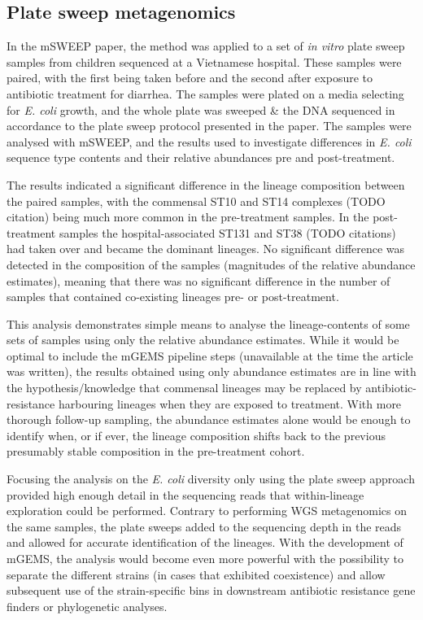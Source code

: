 \documentclass[officiallayout]{tktla}
\begin{document}
\subsection{Plate sweep metagenomics}

In the mSWEEP paper, the method was applied to a set of \textit{in
  vitro} plate sweep samples from children sequenced at a Vietnamese
hospital. These samples were paired, with the first being taken before
and the second after exposure to antibiotic treatment for
diarrhea. The samples were plated on a media selecting for
\textit{E. coli} growth, and the whole plate was sweeped \& the DNA
sequenced in accordance to the plate sweep protocol presented in the
paper. The samples were analysed with mSWEEP, and the results used to
investigate differences in \textit{E. coli} sequence type contents and
their relative abundances pre and post-treatment.

The results indicated a significant difference in the lineage
composition between the paired samples, with the commensal ST10 and
ST14 complexes (TODO citation) being much more common in the
pre-treatment samples. In the post-treatment samples the
hospital-associated ST131 and ST38 (TODO citations) had taken over and
became the dominant lineages. No significant difference was detected
in the composition of the samples (magnitudes of the relative
abundance estimates), meaning that there was no significant difference
in the number of samples that contained co-existing lineages pre- or
post-treatment.

This analysis demonstrates simple means to analyse the
lineage-contents of some sets of samples using only the relative
abundance estimates. While it would be optimal to include the mGEMS
pipeline steps (unavailable at the time the article was written), the
results obtained using only abundance estimates are in line with the
hypothesis/knowledge that commensal lineages may be replaced by
antibiotic-resistance harbouring lineages when they are exposed to
treatment. With more thorough follow-up sampling, the abundance
estimates alone would be enough to identify when, or if ever, the
lineage composition shifts back to the previous presumably stable
composition in the pre-treatment cohort.

Focusing the analysis on the \textit{E. coli} diversity only using the
plate sweep approach provided high enough detail in the sequencing
reads that within-lineage exploration could be performed. Contrary to
performing WGS metagenomics on the same samples, the plate sweeps
added to the sequencing depth in the reads and allowed for accurate
identification of the lineages. With the development of mGEMS, the
analysis would become even more powerful with the possibility to
separate the different strains (in cases that exhibited coexistence)
and allow subsequent use of the strain-specific bins in downstream
antibiotic resistance gene finders or phylogenetic analyses.
\end{document}
